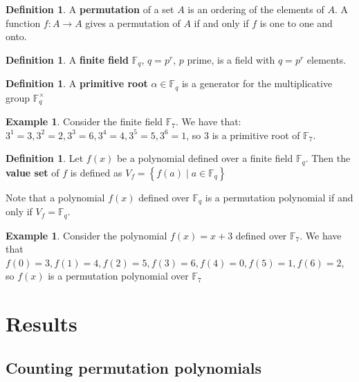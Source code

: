 \documentclass{article}
\theoremstyle{definition}
\newtheorem{definition}[theorem]{Definition}
\newtheorem{example}[theorem]{Example}
\theoremstyle{remark}
\numberwithin{equation}{section}
\begin{document}
\begin{definition}
  A \textbf{permutation} of a set $A$ is an ordering of the elements of $A$. A function $f: A \rightarrow A$ gives a permutation of $A$ if and only if $f$ is one to one and onto.
\end{definition}



\begin{definition}
  A \textbf{finite field} $\mathbb{F}_{q}$, $q=p^r$, $p$ prime, is a field with $q=p^r$ elements.
\end{definition}



\begin{definition}
  A \textbf{primitive root} $\alpha \in \mathbb{F}_q$ is a generator for the multiplicative group $\mathbb{F}_{q}^{\times}$
\end{definition}

\begin{example}
  Consider the finite field $\mathbb{F}_{7}$. We have that: $3^1 = 3, 3^2 = 2, 3^3 = 6, 3^4 = 4, 3^5 = 5, 3^6 = 1$, so $3$ is a primitive root of $\mathbb{F}_{7}$.
\end{example}


\begin{definition}
  Let $f(x)$ be a polynomial defined over a finite field $\mathbb{F}_{q}$. Then the \textbf{value set} of $f$ is defined as $V_{f} = \left\{f(a) \mid a \in \mathbb{F}_{q} \right\}$
\end{definition}

Note that a polynomial $f(x)$ defined over $\mathbb{F}_{q}$ is a permutation polynomial if and only if  $V_{f} = \mathbb{F}_{q}$.


\begin{example}
  Consider the polynomial $f(x) = x+3$ defined over $\mathbb{F}_{7}$. We have that $f(0) = 3, f(1) = 4, f(2) = 5, f(3) = 6, f(4) = 0, f(5) = 1, f(6) = 2$, so $f(x)$ is a permutation polynomial over $\mathbb{F}_{7}$
\end{example}


\section{Results}

\subsection{Counting permutation polynomials}
\end{document}
